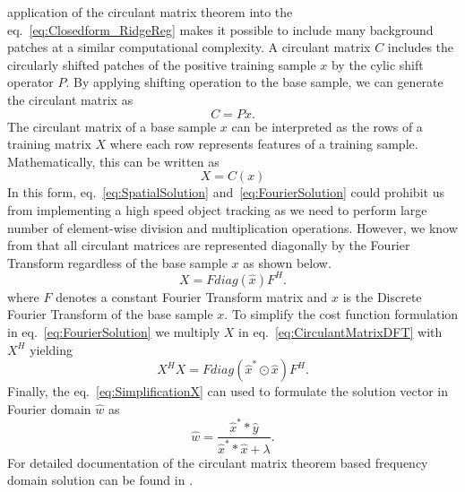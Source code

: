 \documentclass[10pt,twocolumn,letterpaper]{article}
\newcounter{ct}
\begin{document}
application of the circulant matrix theorem into the
eq.~\ref{eq:Closedform_RidgeReg} makes it possible to include many
background patches at a similar computational complexity. A circulant
matrix $C$ includes the circularly shifted patches of the positive
training sample $x$ by the cylic shift operator $P$. By applying
shifting operation to the base sample, we can generate the circulant
matrix as
\begin{equation}
C = Px.
\label{eq:CirculantMatrixGeneration}
\end{equation}
The circulant matrix of a base sample $x$ can be interpreted as the
rows of a training matrix $X$ where each row represents features of a
training sample. Mathematically, this can be written as
\begin{equation}
X = C(x)
\label{eq:CIrculantMatrixTrainingData}
\end{equation}
In this form, eq.~\ref{eq:SpatialSolution}
and~\ref{eq:FourierSolution} could prohibit us from implementing a
high speed object tracking as we need to perform large number of
element-wise division and multiplication operations. However, we know
from \cite{gray2006toeplitz} that all circulant matrices are
represented diagonally by the Fourier Transform regardless of the base
sample $x$ as shown below.
\begin{equation}
X = Fdiag(\hat{x})F^{H}.
\label{eq:CirculantMatrixDFT}
\end{equation}
where $F$ denotes a constant Fourier Transform matrix and $x$ is the
Discrete Fourier Transform of the base sample $x$. To simplify the
cost function formulation in eq.~\ref{eq:FourierSolution} we multiply
$X$ in eq.~\ref{eq:CirculantMatrixDFT} with $X^{H}$ yielding
\begin{equation}
X^{H}X = Fdiag(\hat{x}^{*}\odot \hat{x})F^{H}.
\label{eq:SimplificationX} 
\end{equation}
Finally, the eq.~\ref{eq:SimplificationX} can used to formulate the
solution vector in Fourier domain $\hat{w}$ as
\begin{equation}
\hat{w} = \dfrac{\hat{x}^{*}*\hat{y}}{\hat{x}^{*}*\hat{x}+\lambda}.
\label{eq:DiagonalizedPrimalSolution}
\end{equation}
For detailed documentation of the circulant matrix theorem based
frequency domain solution can be found in
\cite{henriques2012exploiting,henriques2015high}.
\end{document}
